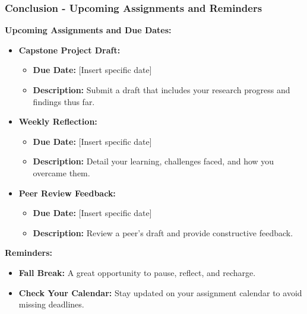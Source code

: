 \documentclass[aspectratio=169]{beamer}
\begin{document}
\begin{frame}[fragile]
    \frametitle{Conclusion - Upcoming Assignments and Reminders}
    \textbf{Upcoming Assignments and Due Dates:}
    \begin{itemize}
        \item \textbf{Capstone Project Draft:} 
            \begin{itemize}
                \item \textbf{Due Date:} [Insert specific date]
                \item \textbf{Description:} Submit a draft that includes your research progress and findings thus far.
            \end{itemize}
            
        \item \textbf{Weekly Reflection:}
            \begin{itemize}
                \item \textbf{Due Date:} [Insert specific date]
                \item \textbf{Description:} Detail your learning, challenges faced, and how you overcame them.
            \end{itemize}
            
        \item \textbf{Peer Review Feedback:}
            \begin{itemize}
                \item \textbf{Due Date:} [Insert specific date]
                \item \textbf{Description:} Review a peer's draft and provide constructive feedback.
            \end{itemize}
    \end{itemize}

    \textbf{Reminders:}
    \begin{itemize}
        \item \textbf{Fall Break:} A great opportunity to pause, reflect, and recharge.
        \item \textbf{Check Your Calendar:} Stay updated on your assignment calendar to avoid missing deadlines.
    \end{itemize}
\end{frame}
\end{document}
